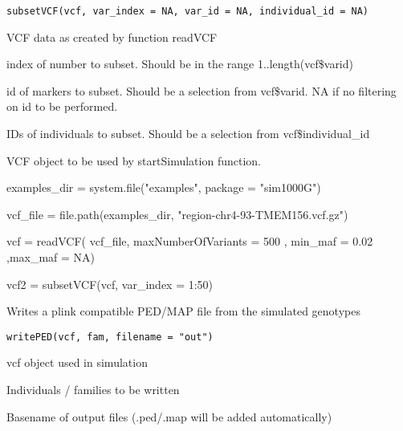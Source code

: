\documentclass[letterpaper]{book}
\begin{document}
%
\begin{Usage}
\begin{verbatim}
subsetVCF(vcf, var_index = NA, var_id = NA, individual_id = NA)
\end{verbatim}
\end{Usage}
%
\begin{Arguments}
\begin{ldescription}
\item[\code{vcf}] VCF data as created by function readVCF

\item[\code{var\_index}] index of number to subset. Should be in the range 1..length(vcf\$varid)

\item[\code{var\_id}] id  of markers to subset. Should be a selection from vcf\$varid. NA if no filtering on id to be performed.

\item[\code{individual\_id}] IDs of individuals to subset. Should be a selection from vcf\$individual\_id
\end{ldescription}
\end{Arguments}
%
\begin{Value}
VCF object to be used by startSimulation function.
\end{Value}
%
\begin{Examples}
\begin{ExampleCode}

examples_dir = system.file("examples", package = "sim1000G")

vcf_file = file.path(examples_dir, "region-chr4-93-TMEM156.vcf.gz")

vcf = readVCF( vcf_file, maxNumberOfVariants = 500 ,
               min_maf = 0.02 ,max_maf = NA)

vcf2 = subsetVCF(vcf, var_index = 1:50)

\end{ExampleCode}
\end{Examples}
%
\begin{Description}\relax
Writes a plink compatible PED/MAP file from the simulated genotypes
\end{Description}
%
\begin{Usage}
\begin{verbatim}
writePED(vcf, fam, filename = "out")
\end{verbatim}
\end{Usage}
%
\begin{Arguments}
\begin{ldescription}
\item[\code{vcf}] vcf object used in simulation

\item[\code{fam}] Individuals / families to be written

\item[\code{filename}] Basename of output files (.ped/.map will be added automatically)
\end{ldescription}
\end{Arguments}
\printindex{}
\end{document}
